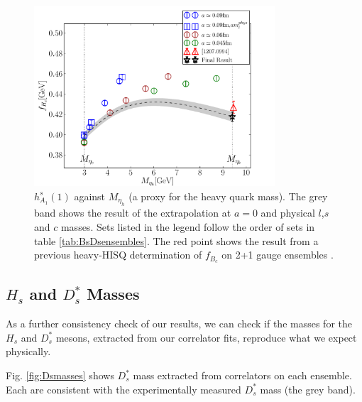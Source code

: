 \begin{figure}[htb!]
  \begin{center}
  \hspace{-20pt}
  \includegraphics[width=0.80\textwidth]{images/BsDsstar/fHcvsmh.pdf}
  \caption{ $h_{A_1}^s(1)$ against $M_{\eta_h}$ (a proxy for the heavy quark mass). The grey band shows the result of the extrapolation at $a=0$ and physical $l$,$s$ and $c$ masses. Sets listed in the legend follow the order of sets in table \ref{tab:BsDsensembles}. The red point shows the result from a previous heavy-HISQ determination of $f_{B_c}$ on 2+1 gauge ensembles \cite{McNeile:2012qf}. \label{fig:fHc_vsmh}}
  \end{center}
\end{figure}

\subsection{$H_s$ and $D_s^*$ Masses}

As a further consistency check of our results, we can check if the masses for the $H_s$ and $D_s^*$ mesons, extracted from our correlator fits, reproduce what we expect physically.

Fig. \ref{fig:Dsmasses} shows $D_s^*$ mass extracted from correlators on each ensemble. Each are consistent with the experimentally measured $D_s^*$ mass (the grey band).

